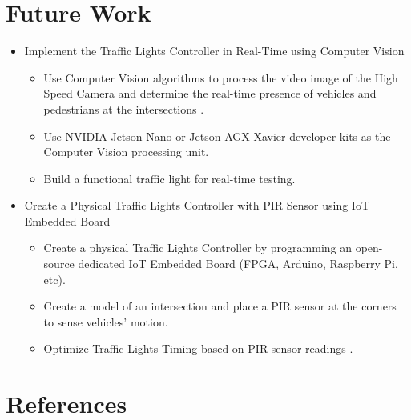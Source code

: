 \documentclass[12pt, a4paper,titlepage]{article}
\begin{document}
\newpage

\section{Future Work}
\label{sec_future}

\begin{itemize}
	\item {\large Implement the Traffic Lights Controller in Real-Time using Computer Vision}
	\begin{itemize}
		\item Use Computer Vision algorithms to process the video image of the High Speed Camera and determine the real-time presence of vehicles and pedestrians at the intersections \cite{Rachmadi11}.
		\item Use NVIDIA Jetson Nano or Jetson AGX Xavier developer kits as the Computer Vision processing unit.
		\item Build a functional traffic light for real-time testing.
	\end{itemize}
\end{itemize}

\begin{itemize}
	\item {\large Create a Physical Traffic Lights Controller with PIR Sensor using IoT Embedded Board}
	\begin{itemize}
		\item Create a physical Traffic Lights Controller by programming an open-source dedicated IoT Embedded Board (FPGA, Arduino, Raspberry Pi, etc).
		\item Create a model of an intersection and place a PIR sensor at the corners to sense vehicles' motion. 
		\item Optimize Traffic Lights Timing based on PIR sensor readings \cite{Zachariah17}. 
	\end{itemize}
\end{itemize}

\newpage
\section{References}
\label{sec_references}
\end{document}
